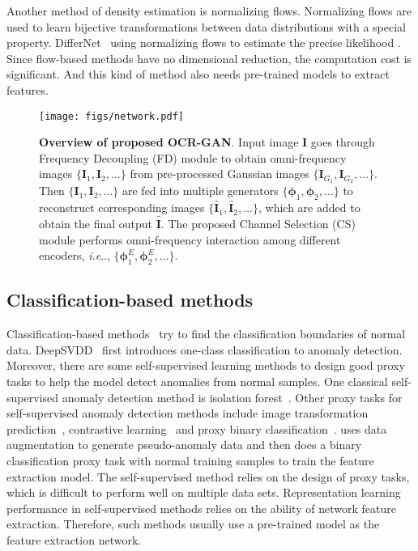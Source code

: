 \documentclass[lettersize,journal]{IEEEtran}
\makeatletter
\DeclareRobustCommand\onedot{\futurelet\@let@token\@onedot}
\def\@onedot{\ifx\@let@token.\else.\null\fi\xspace}
\def\ie{\emph{i.e}\onedot} \def\Ie{\emph{I.e}\onedot}
\makeatother
\begin{document}
Another method of density estimation is normalizing flows. Normalizing flows are used to learn bijective transformations between data distributions with a special property. DifferNet~\cite{rudolph2021same} using normalizing flows to estimate the precise likelihood . Since flow-based methods have no dimensional reduction, the computation cost is significant. And this kind of method also needs pre-trained models to extract features.

\begin{figure*}[ht]
    \centering
    \texttt{[image: figs/network.pdf]}
    \caption{\textbf{Overview of proposed OCR-GAN}. Input image $\bm{I}$ goes through Frequency Decoupling (FD) module to obtain omni-frequency images $\{\bm{I}_1, \bm{I}_2, \dots\}$ from pre-processed Gaussian images $\{\bm{I}_{G_1}, \bm{I}_{G_2}, \dots\}$. Then $\{\bm{I}_1, \bm{I}_2, \dots\}$ are fed into multiple generators $\{\bm{\phi}_1, \bm{\phi}_2, \dots\}$ to reconstruct corresponding images $\{\hat{\bm{I}}_1, \hat{\bm{I}}_2, \dots\}$, which are added to obtain the final output $\hat{\bm{I}}$. The proposed Channel Selection (CS) module performs omni-frequency interaction among different encoders, \ie, $\{\bm{\phi}_1^E, \bm{\phi}_2^E, \dots\}$.}
    \label{fig:network}
\end{figure*}

\subsection{Classification-based methods}
Classification-based methods~\cite{ju2015image} try to find the classification boundaries of normal data. DeepSVDD~\cite{ruff2018deep} first introduces one-class classification to anomaly detection. 
Moreover, there are some self-supervised learning methods to design good proxy tasks to help the model detect anomalies from normal samples. One classical self-supervised anomaly detection method is isolation forest~\cite{liu2008isolation}. 
Other proxy tasks for self-supervised anomaly detection methods include image transformation prediction~\cite{golan2018deep,bergman2019classification }, contrastive learning~\cite{tack2020csi} and proxy binary classification~\cite{li2021cutpaste}. \cite{li2021cutpaste} uses data augmentation to generate pseudo-anomaly data and then does a binary classification proxy task with normal training samples to train the feature extraction model. The self-supervised method relies on the design of proxy tasks, which is difficult to perform well on multiple data sets. Representation learning performance in self-supervised methods relies on the ability of network feature extraction. Therefore, such methods usually use a pre-trained model as the feature extraction network.
\end{document}
